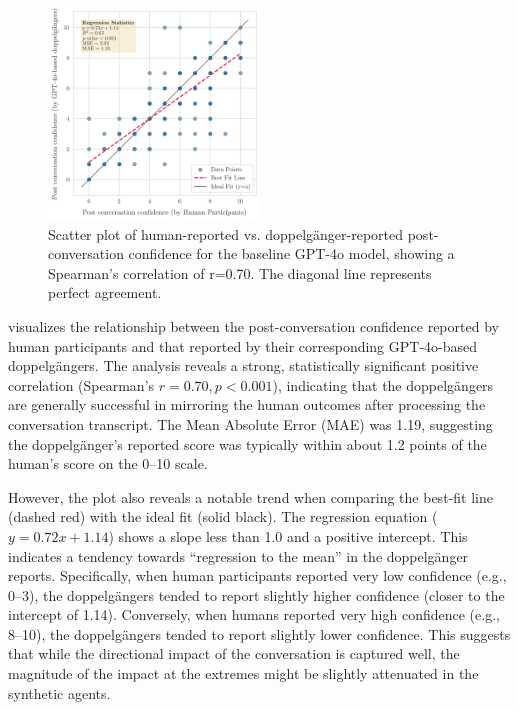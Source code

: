 \begin{figure}[htpb]
	\centering
	\includegraphics[width=0.5\textwidth]{fig/post_conf_gpt4o_vs_human.png}
	\caption[Scatter plot of human-reported vs. doppelgänger-reported post-conversation confidence]{Scatter plot of human-reported vs. doppelgänger-reported post-conversation confidence for the baseline GPT-4o model, showing a Spearman's correlation of r=0.70. The diagonal line represents perfect agreement.}
	\label{fig:post-conf-gpt4o-vs-human}
\end{figure}


 visualizes the relationship between the post-conversation confidence reported by human participants and that reported by their corresponding GPT-4o-based doppelgängers. The analysis reveals a strong, statistically significant positive correlation (Spearman's $r=0.70, p < 0.001$), indicating that the doppelgängers are generally successful in mirroring the human outcomes after processing the conversation transcript. The Mean Absolute Error (MAE) was 1.19, suggesting the doppelgänger's reported score was typically within about 1.2 points of the human's score on the 0--10 scale.

However, the plot also reveals a notable trend when comparing the best-fit line (dashed red) with the ideal fit (solid black). The regression equation ($y=0.72x+1.14$) shows a slope less than 1.0 and a positive intercept. This indicates a tendency towards ``regression to the mean'' in the doppelgänger reports. Specifically, when human participants reported very low confidence (e.g., 0--3), the doppelgängers tended to report slightly higher confidence (closer to the intercept of 1.14). Conversely, when humans reported very high confidence (e.g., 8--10), the doppelgängers tended to report slightly lower confidence. This suggests that while the directional impact of the conversation is captured well, the magnitude of the impact at the extremes might be slightly attenuated in the synthetic agents.

